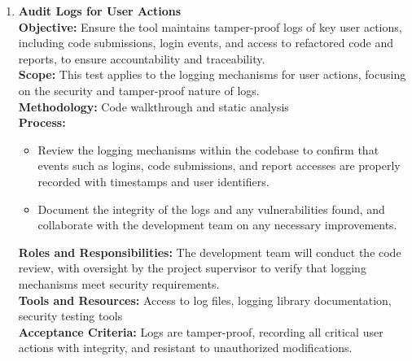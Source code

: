\documentclass[12pt, titlepage]{article}
\begin{document}
\begin{enumerate}[label={\bf \textcolor{Maroon}{test-SRT-\arabic*}}, wide=0pt, font=\itshape]
  \item \textbf{Audit Logs for User Actions} \\[2mm]
    \textbf{Objective:} Ensure the tool maintains tamper-proof logs of key user actions, including code submissions, login events, and access to refactored code and reports, to ensure accountability and traceability. \\[2mm]
    \textbf{Scope:} This test applies to the logging mechanisms for user actions, focusing on the security and tamper-proof nature of logs. \\[2mm]
    \textbf{Methodology:} Code walkthrough and static analysis \\[2mm]
    \textbf{Process:}
    \begin{itemize}
      \item Review the logging mechanisms within the codebase to confirm that events such as logins, code submissions, and report accesses are properly recorded with timestamps and user identifiers.
      \item Document the integrity of the logs and any vulnerabilities found, and collaborate with the development team on any necessary improvements.
    \end{itemize}
    \textbf{Roles and Responsibilities:} The development team will conduct the code review, with oversight by the project supervisor to verify that logging mechanisms meet security requirements. \\[2mm]
    \textbf{Tools and Resources:} Access to log files, logging library documentation, security testing tools \\[2mm]
    \textbf{Acceptance Criteria:} Logs are tamper-proof, recording all critical user actions with integrity, and resistant to unauthorized modifications.


\end{enumerate}
\end{document}
